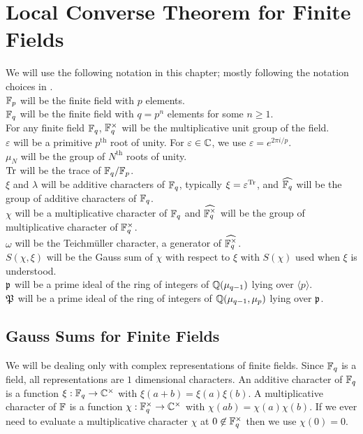 \chapter{Local Converse Theorem for Finite Fields}	%

\noindent We will use the following notation in this chapter; mostly following the notation choices in \cite{Lang1990}.\\
$\mathbb{F}_p$ will be the finite field with $p$ elements.\\
$\mathbb{F}_q$ will be the finite field with $q = p^n$ elements for some $n \geq 1$.\\
For any finite field $\mathbb{F}_q$, $\mathbb{F}_q^\times$ will be the multiplicative unit group of the field.\\
$\varepsilon$ will be a primitive $p^\text{th}$ root of unity. For $\varepsilon \in \mathbb{C}$, we use $\varepsilon = e^{2 \pi i /p}$.\\
$\mu_N$ will be the group of $N^\text{th}$ roots of unity.\\
$\textrm{Tr}$ will be the trace of $\mathbb{F}_q/\mathbb{F}_p$.\\
$\xi$ and $\lambda$ will be additive characters of $\mathbb{F}_q$, typically $\xi = \varepsilon^{\textrm{Tr}}$, and $\widehat{\mathbb{F}_q}$ will be the group of additive characters of $\mathbb{F}_q$. \\
$\chi$ will be a multiplicative character of $\mathbb{F}_q$ and $\widehat{\mathbb{F}^\times_q}$ will be the group of multiplicative character of $\mathbb{F}_q^\times$.\\
$\omega$ will be the Teichm\"uller character, a generator of $\widehat{\mathbb{F}^\times_q}$.\\
$S(\chi, \xi)$ will be the Gauss sum of $\chi$ with respect to $\xi$ with $S(\chi)$ used when $\xi$ is understood.\\
$\mathfrak{p}$ will be a prime ideal of the ring of integers of $\mathbb{Q}(\mu_{q-1})$ lying over $\langle p \rangle$.\\
$\mathfrak{P}$ will be a prime ideal of the ring of integers of $\mathbb{Q}(\mu_{q-1}, \mu_p)$ lying over $\mathfrak{p}$.\\
\section{Gauss Sums for Finite Fields}
\label{sec:finite-fields-intro}

We will be dealing only with complex representations of finite fields.
Since $\mathbb{F}_q$ is a field, all representations are $1$ dimensional characters.
An additive character of $\mathbb{F}_q$ is a function $\xi : \mathbb{F}_q \to \mathbb{C}^\times$ with $\xi(a + b) = \xi(a)\xi(b)$.
A multiplicative character of $\mathbb{F}$ is a function $\chi : \mathbb{F}_q^\times \to \mathbb{C}^\times$ with $\chi(ab) = \chi(a)\chi(b)$.
If we ever need to evaluate a multiplicative character $\chi$ at $0 \not \in \mathbb{F}_q^\times$ then we use $\chi(0) = 0$. \\

